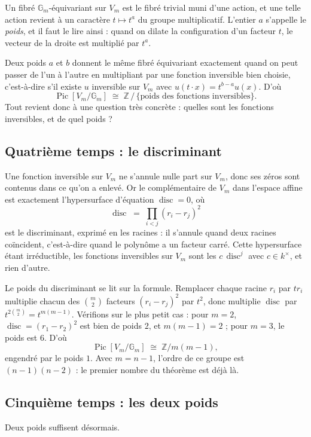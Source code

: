 \documentclass[11pt,a4paper]{amsart}
\theoremstyle{definition}
\theoremstyle{plain}
\theoremstyle{remark}
\newcommand{\Pic}{\operatorname{Pic}}
\newcommand{\Gm}{\mathbb G_m}
\newcommand{\disc}{\operatorname{disc}}
\begin{document}
Un fibré $\Gm$-équivariant sur $V_m$ est le fibré trivial muni d'une action, et une telle action revient à un caractère $t \mapsto t^a$ du groupe multiplicatif. L'entier $a$ s'appelle le \emph{poids}, et il faut le lire ainsi : quand on dilate la configuration d'un facteur $t$, le vecteur de la droite est multiplié par $t^a$.

Deux poids $a$ et $b$ donnent le même fibré équivariant exactement quand on peut passer de l'un à l'autre en multipliant par une fonction inversible bien choisie, c'est-à-dire s'il existe $u$ inversible sur $V_m$ avec $u(t\cdot x) = t^{b-a}u(x)$. D'où
\[
\Pic[V_m/\Gm] \;\cong\; \mathbb Z \,/\, \{\text{poids des fonctions inversibles}\}.
\]
Tout revient donc à une question très concrète : quelles sont les fonctions inversibles, et de quel poids ?

\subsection{Quatrième temps : le discriminant}

Une fonction inversible sur $V_m$ ne s'annule nulle part sur $V_m$, donc ses zéros sont contenus dans ce qu'on a enlevé. Or le complémentaire de $V_m$ dans l'espace affine est exactement l'hypersurface d'équation $\disc = 0$, où
\[
\disc \;=\; \prod_{i<j}(r_i - r_j)^2
\]
est le discriminant, exprimé en les racines : il s'annule quand deux racines coïncident, c'est-à-dire quand le polynôme a un facteur carré. Cette hypersurface étant irréductible, les fonctions inversibles sur $V_m$ sont les $c\,\disc^j$ avec $c \in k^\times$, et rien d'autre.

Le poids du discriminant se lit sur la formule. Remplacer chaque racine $r_i$ par $t r_i$ multiplie chacun des $\binom{m}{2}$ facteurs $(r_i - r_j)^2$ par $t^2$, donc multiplie $\disc$ par $t^{2\binom{m}{2}} = t^{m(m-1)}$. Vérifions sur le plus petit cas : pour $m = 2$, $\disc = (r_1-r_2)^2$ est bien de poids $2$, et $m(m-1) = 2$ ; pour $m = 3$, le poids est $6$. D'où
\[
\Pic[V_m/\Gm] \;\cong\; \mathbb Z/m(m-1),
\]
engendré par le poids $1$. Avec $m = n-1$, l'ordre de ce groupe est $(n-1)(n-2)$ : le premier nombre du théorème est déjà là.

\subsection{Cinquième temps : les deux poids}

Deux poids suffisent désormais.
\end{document}
